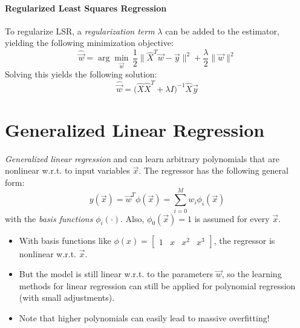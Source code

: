 			\paragraph{Regularized Least Squares Regression}
				To regularize LSR, a \emph{regularization term} \(\lambda\) can be added to the estimator, yielding the following minimization objective:
				\begin{equation}
					\hat{\vec{w}} = \arg\min\limits_{\vec{w}} \, \frac{1}{2} \big\lVert \hat{X}^T \vec{w} - \vec{y} \big\rVert^2 + \frac{\lambda}{2} \lVert \vec{w} \rVert^2
				\end{equation}
				Solving this yields the following solution:
				\begin{equation}
					\hat{\vec{w}} = \Big( \hat{X} \hat{X}^T + \lambda I \Big)^{-1} \hat{X} \vec{y}
				\end{equation}


	\section{Generalized Linear Regression}
		\emph{Generalized linear regression} and can learn arbitrary polynomials that are nonlinear w.r.t. to input variables \(\vec{x}\). The regressor has the following general form:
		\begin{equation}
			y(\vec{x}) = \vec{w}^T \phi(\vec{x}) = \sum_{i = 0}^{M} w_i \phi_i(\vec{x})
		\end{equation}
		with the \emph{basis functions} \( \phi_i(\cdot) \). Also, \( \phi_0(\vec{x}) = 1 \) is assumed for every \(\vec{x}\).

		\begin{itemize}
			\item With basis functions like \( \phi(x) = \begin{bmatrix} 1 & x & x^2 & x^3 \end{bmatrix} \), the regressor is nonlinear w.r.t. \(\vec{x}\).
			\item But the model is still linear w.r.t. to the parameters \(\vec{w}\), so the learning methods for linear regression can still be applied for polynomial regression (with small adjustments).
			\item Note that higher polynomials can easily lead to massive overfitting!
		\end{itemize}

